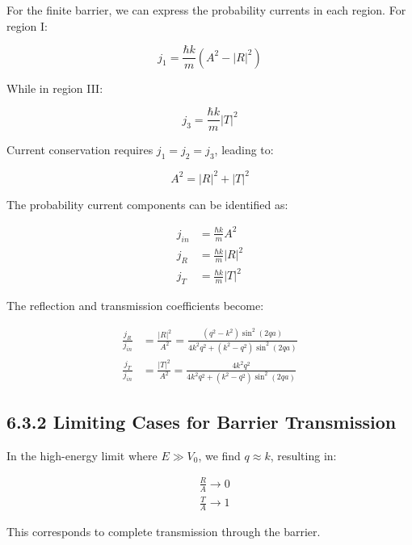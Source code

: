 \documentclass[italian]{HKNdocument}
\begin{document}
For the finite barrier, we can express the probability currents in each region. For region I:

\begin{equation*}
j_{1}=\frac{\hbar k}{m}\left(A^{2}-|R|^{2}\right) \tag{6.61}
\end{equation*}

While in region III:

\begin{equation*}
j_{3}=\frac{\hbar k}{m}|T|^{2} \tag{6.62}
\end{equation*}

Current conservation requires $j_1 = j_2 = j_3$, leading to:

\begin{equation*}
A^{2}=|R|^{2}+|T|^{2} \tag{6.63}
\end{equation*}

The probability current components can be identified as:

\begin{align*}
j_{i n} & =\frac{\hbar k}{m} A^{2} \\
j_{R} & =\frac{\hbar k}{m}|R|^{2}  \tag{6.64}\\
j_{T} & =\frac{\hbar k}{m}|T|^{2}
\end{align*}

The reflection and transmission coefficients become:

\begin{align*}
\frac{j_{R}}{j_{i n}} & =\frac{|R|^{2}}{A^{2}}=\frac{\left(q^{2}-k^{2}\right) \sin ^{2}(2 q a)}{4 k^{2} q^{2}+\left(k^{2}-q^{2}\right) \sin ^{2}(2 q a)} \\
\frac{j_{T}}{j_{i n}} & =\frac{|T|^{2}}{A^{2}}=\frac{4 k^{2} q^{2}}{4 k^{2} q^{2}+\left(k^{2}-q^{2}\right) \sin ^{2}(2 q a)} \tag{6.65}
\end{align*}

\subsection*{6.3.2 Limiting Cases for Barrier Transmission}

In the high-energy limit where $E \gg V_0$, we find $q \approx k$, resulting in:

\begin{align*}
& \frac{R}{A} \rightarrow 0 \\
& \frac{T}{A} \rightarrow 1 \tag{6.66}
\end{align*}

This corresponds to complete transmission through the barrier.
\end{document}
